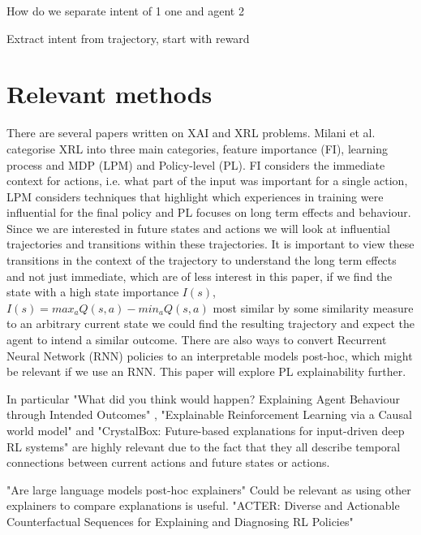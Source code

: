 \documentclass[UKenglish]{uiomasterthesis}
\begin{document}
How do we separate intent of 1 one and agent 2

Extract intent from trajectory, start with reward


\section{Relevant methods}
There are several papers written on XAI and XRL problems. Milani et al.\cite{milani2022survey} categorise XRL into three main categories, feature importance (FI), learning process and MDP (LPM) and Policy-level (PL). FI considers the immediate context for actions, i.e. what part of the input was important for a single action, LPM considers techniques that highlight which experiences in training were influential for the final policy and PL focuses on long term effects and behaviour. Since we are interested in future states and actions we will look at influential trajectories and transitions within these trajectories. It is important to view these transitions in the context of the trajectory to understand the long term effects and not just immediate, which are of less interest in this paper, if we find the state with a high state importance $I(s)$, $I(s) = max_aQ(s,a)-min_aQ(s,a)$ most similar by some similarity measure to an arbitrary current state we could find the resulting trajectory and expect the agent to intend a similar outcome. There are also ways to convert Recurrent Neural Network (RNN) policies to an interpretable models post-hoc, which might be relevant if we use an RNN. This paper will explore PL explainability further.

In particular "What did you think would happen? Explaining Agent Behaviour through Intended Outcomes" \cite{yau2020did}, "Explainable Reinforcement Learning via a Causal world model" \cite{yu2024explainable} and "CrystalBox: Future-based explanations for input-driven deep RL systems" \cite{patel2024crystalbox} are highly relevant due to the fact that they all describe temporal connections between current actions and future states or actions.

"Are large language models post-hoc explainers" \cite{kroeger2024large} Could be relevant as using other explainers to compare explanations is useful. "ACTER: Diverse and Actionable Counterfactual Sequences for Explaining and Diagnosing RL Policies" \cite{gajcin2024acter} 
\end{document}

